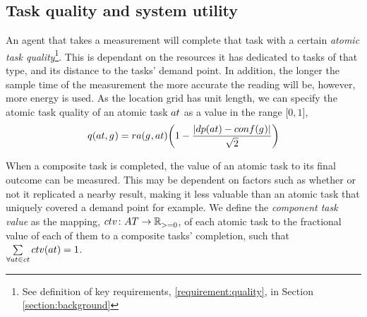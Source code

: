 \newcommand{\functionAtomicTaskQualitySignature}[2]{
\ifx&#1&
	\functionSignature{q} {\varAtomicTask{}{}, \varAgent{}{}}
\else
\functionSignature{q}{#1, #2}
\fi
}
\newcommand{\functionAtomicTaskQualitySensor}[2]{
	\functionSignature{q} {\varAtomicTask{}{}, \functionSenseRole{}{}}
}

\newcommand{\functionComponentTaskValue}[2]{
	\functionSignature{ctv}{\varAtomicTask{}{}}
}
\newcommand{\formalComponentTaskValue}[2]{
	\functionFormal{ctv}{\setAtomicTask{}{}}{\setRealNumbersNonNegative{}{}}
}
\newcommand{\functionSystemUtility}[2]{\functionSignature{u}{\setTime{}{}}}
\newcommand{\functionCompositeTaskQuality}[2]{
	\functionSignature{taq_\varTime{}{}}{\varCompositeTask{}{}}
}
\newcommand{\functionTaskAbsoluteValue}[2]{
	\functionSignature{atv}{\varCompositeTask{}{}, \varAtomicTask{}{}}
}

\newcommand{\functionRelativeDistance}[2]{
	\functionSignature{dist}{\varAtomicTask{}{}, \varAgent{}{}}
}
\subsection{Task quality and system utility}
\label{section:task_quality}

An agent that takes a measurement will complete that task with a certain \textit{atomic task quality}\footnote{See definition of key requirements, \ref{requirement:quality}, in Section \ref{section:background}}. This is dependant on the resources it has dedicated to tasks of that type, and its distance to the tasks' demand point.  In addition, the longer the sample time of the measurement the more accurate the reading will be, however,  more energy is used. As the location grid has unit length, we can specify the atomic task quality of an atomic task $\varAtomicTask{}{}$ as a value in the range $\lbrack 0, 1 \rbrack$,
\begin{equation}
	\label{eq:atomic_task_quality}
	\functionAtomicTaskQualitySignature{}{} = 
	{\functionTaskResourceAllocation{}{}}
	\bigg ( 1 - \frac{\funcSize{
			\functionTaskDemandPoint{}{} - \functionDeployment{\varAgent{}{}}{} 
		}{}}{{\sqrt{2}}}\bigg )
\end{equation}

When a composite task is completed, the value of an atomic task to its final outcome can be measured. This may be dependent on factors such as whether or not it replicated a nearby result, making it less valuable than an atomic task that uniquely covered a demand point for example. We define the \textit{component task value} as the mapping, $\formalComponentTaskValue{}{}$,  of each atomic task to the fractional value of each of them to a composite tasks' completion, such that $\sum\limits_{\forall \varAtomicTask{}{} \in \varCompositeTask{}{}} \functionComponentTaskValue{}{} = 1$.

